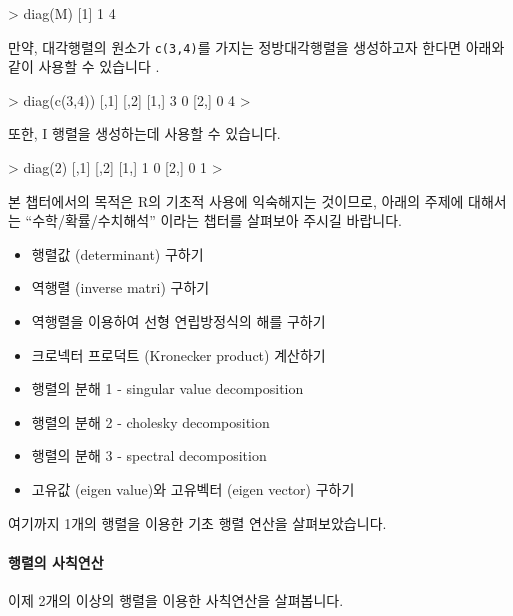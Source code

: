 \documentclass{book}
\begin{document}
\begin{Schunk}
\begin{Soutput}
> diag(M)
[1] 1 4
\end{Soutput}
\end{Schunk}

만약, 대각행렬의 원소가 \texttt{c(3,4)}를 가지는 정방대각행렬을 생성하고자 한다면 아래와 같이 사용할 수 있습니다 .

\begin{Schunk}
\begin{Soutput}
> diag(c(3,4))
     [,1] [,2]
[1,]    3    0
[2,]    0    4
> 
\end{Soutput}
\end{Schunk}

또한, I 행렬을 생성하는데 사용할 수 있습니다. 

\begin{Schunk}
\begin{Soutput}
> diag(2)
     [,1] [,2]
[1,]    1    0
[2,]    0    1
>
\end{Soutput}
\end{Schunk}

본 챕터에서의 목적은 R의 기초적 사용에 익숙해지는 것이므로, 아래의 주제에 대해서는 ``수학/확률/수치해석'' 이라는 챕터를 살펴보아 주시길 바랍니다.
\begin{itemize}
	\item 행렬값 (determinant) 구하기 
	\item 역행렬 (inverse matri) 구하기 
	\item 역행렬을 이용하여 선형 연립방정식의 해를 구하기
	\item 크로넥터 프로덕트 (Kronecker product) 계산하기 
	\item 행렬의 분해 1 - singular value decomposition 
	\item 행렬의 분해 2 - cholesky decomposition 
	\item 행렬의 분해 3 - spectral decomposition
	\item 고유값 (eigen value)와 고유벡터 (eigen vector) 구하기  
\end{itemize}

여기까지 1개의 행렬을 이용한 기초 행렬 연산을 살펴보았습니다. 

\paragraph{행렬의 사칙연산} 이제 2개의 이상의 행렬을 이용한 사칙연산을 살펴봅니다.
\end{document}
